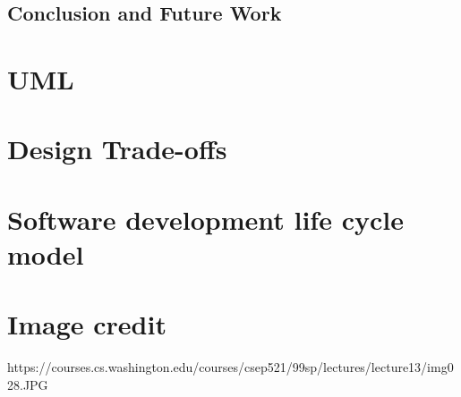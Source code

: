 \documentclass[sigconf]{acmart}
\begin{document}
\subsection{Conclusion and Future Work}

\section{UML}
\section{Design Trade-offs}
\section{Software development life cycle model}

\section{Image credit}
https://courses.cs.washington.edu/courses/csep521/99sp/lectures/lecture13/img028.JPG
\end{document}
